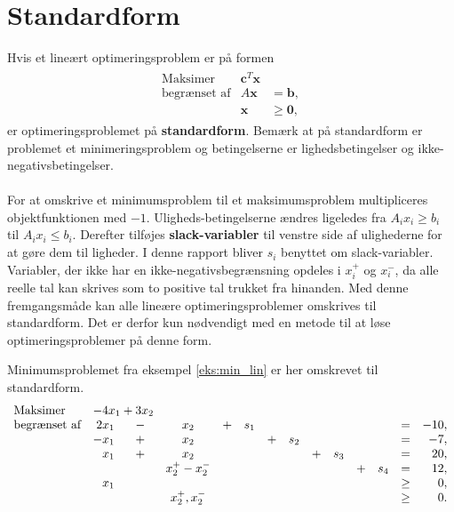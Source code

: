 \section{Standardform}
% 
Hvis et lineært optimeringsproblem er på formen
%
\begin{align*}
\begin{array}{lrl}
\text{Maksimer}		&\textbf{c}^T\textbf{x}	&				\\
\text{begrænset af}	&A\textbf{x}	&=\mathbf{b},	\\
					&\mathbf{x}				&\geq \mathbf{0},
\end{array}
\end{align*}
%
er optimeringsproblemet på \textbf{standardform}.
Bemærk at på standardform er problemet et minimeringsproblem og betingelserne er lighedsbetingelser og ikke-negativsbetingelser.\\\\
%
For at omskrive et minimumsproblem til et maksimumsproblem multipliceres objektfunktionen med $-1$.
Uligheds-betingelserne ændres ligeledes fra $A_ix_i \geq b_i$ til $A_ix_i \leq b_i$.
Derefter tilføjes \textbf{slack-variabler} til venstre side af ulighederne for at gøre dem til ligheder.
I denne rapport bliver $s_i$ benyttet om slack-variabler.
Variabler, der ikke har en ikke-negativsbegrænsning opdeles i $x_i^+$ og $x_i^-$, da alle reelle tal kan skrives som to positive tal trukket fra hinanden.
Med denne fremgangsmåde kan alle lineære optimeringsproblemer omskrives til standardform.
Det er derfor kun nødvendigt med en metode til at løse optimeringsproblemer på denne form.
%

%
\begin{eks}
Minimumsproblemet fra eksempel \ref{eks:min_lin} er her omskrevet til standardform.
%
\begin{align*}
\begin{array}{lrcccrcrcrcrcrcr}
\text{Maksimer}		&	\multicolumn{2}{c}{-4x_1 + 3x_2}\\
\text{begrænset af}	&2x_1	&-	&x_2		&+	&s_1&	&	&	&	&	&	&= 		&-10,\\
					&-x_1	&+	&x_2		&	&	&+	&s_2&	&	&	&	&=		& -7,\\
					&x_1	&+	&x_2		&	&	&	&	&+	&s_3&	&	&=		& 20,\\
					& 		&	&x_2^+-x_2^-&	&	&	&	&	&	&+	&s_4&=		& 12,\\
					&x_1	&	&			&	&	&	&	&	&	&	&	&\geq	& 0,\\
					&		&	&x_2^+,x_2^-&	&	&	&	&	&	&	&	&\geq	& 0.\\
\end{array}
\end{align*}
\end{eks}
%
